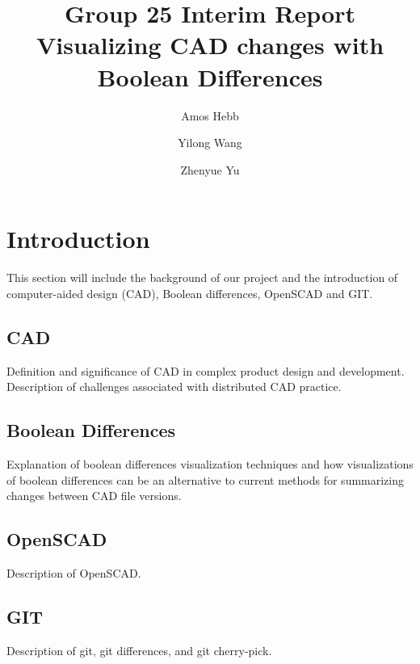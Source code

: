 \documentclass[sigconf,authorversion,nonacm]{acmart}
\begin{document}
\title{Group 25 Interim Report\\Visualizing CAD changes with Boolean Differences}

\author{Amos Hebb}
\author{Yilong Wang}
\author{Zhenyue Yu}
\makeatletter
\def\@ACM@checkaffil{%
	\if@ACM@instpresent\else
		\ClassWarningNoLine{\@classname}{No institution present for an affiliation}%
	\fi
	\if@ACM@citypresent\else
		\ClassWarningNoLine{\@classname}{No city present for an affiliation}%
	\fi
	\if@ACM@countrypresent\else
		\ClassWarningNoLine{\@classname}{No country present for an affiliation}%
	\fi
}
\makeatother

\maketitle

\section{Introduction}
This section will include the background of our project and the introduction of computer-aided design (CAD), Boolean differences, OpenSCAD and GIT.
\subsection{CAD}
Definition and significance of CAD in complex product design and development. Description of challenges associated with distributed CAD practice.
\subsection{Boolean Differences}
Explanation of boolean differences visualization techniques and how visualizations of boolean differences can be an alternative to current methods for summarizing changes between CAD file versions.
\subsection{OpenSCAD}
Description of OpenSCAD.
\subsection{GIT}
Description of git, git differences, and git cherry-pick.
\end{document}
